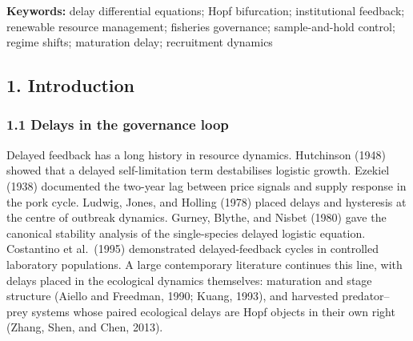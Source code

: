 \documentclass[11pt]{article}
\begin{document}
\begin{abstract}
The analysed class is deliberately stock-agnostic: a harvested renewable
stock under institutional control, with fisheries as the motivating
instance. Its three design coordinates --- the sign structure of the
response rule, the deployment delay, and the review cadence --- are
therefore available to any periodically reviewed renewable-resource
regime. Documented governance timelines occupy the same scales: the
northern cod record runs from annual assessment with incremental
response to the 1992 moratorium and, thirty-two years later, the 2024
reopening. That record grounds the two timing coordinates without
calibrating any coefficient. The message of the paper is stated plainly.
The form and timing of institutional response, not ecological lag alone,
determine whether governance stabilises or destabilises a harvested
stock; and the review interval acts as a local spectral design parameter
--- a setting that shapes the eigenvalues which decide local stability
--- with opposite effects under the two rules.

\end{abstract}

\textbf{Keywords:} delay differential equations; Hopf bifurcation;
institutional feedback; renewable resource management; fisheries
governance; sample-and-hold control; regime shifts; maturation delay;
recruitment dynamics

\subsection{1. Introduction}\label{introduction}

\subsubsection{1.1 Delays in the governance
loop}\label{delays-in-the-governance-loop}

Delayed feedback has a long history in resource dynamics. Hutchinson
(1948) showed that a delayed self-limitation term destabilises logistic
growth. Ezekiel (1938) documented the two-year lag between price signals
and supply response in the pork cycle. Ludwig, Jones, and Holling (1978)
placed delays and hysteresis at the centre of outbreak dynamics. Gurney,
Blythe, and Nisbet (1980) gave the canonical stability analysis of the
single-species delayed logistic equation. Costantino et al.~(1995)
demonstrated delayed-feedback cycles in controlled laboratory
populations. A large contemporary literature continues this line, with
delays placed in the ecological dynamics themselves: maturation and
stage structure (Aiello and Freedman, 1990; Kuang, 1993), and harvested
predator--prey systems whose paired ecological delays are Hopf objects
in their own right (Zhang, Shen, and Chen, 2013).
\end{document}
